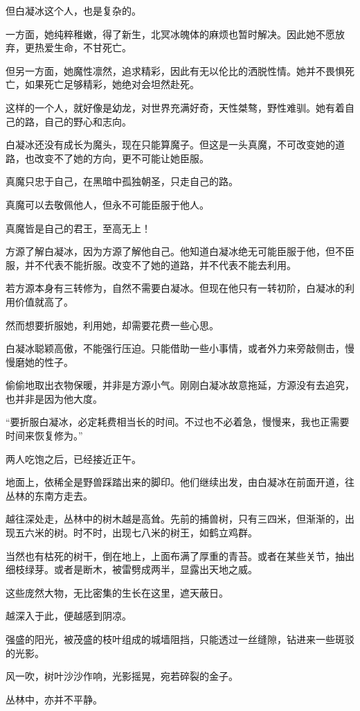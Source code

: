 \begin{this_body}
但白凝冰这个人，也是复杂的。

一方面，她纯粹稚嫩，得了新生，北冥冰魄体的麻烦也暂时解决。因此她不愿放弃，更热爱生命，不甘死亡。

但另一方面，她魔性凛然，追求精彩，因此有无以伦比的洒脱性情。她并不畏惧死亡，如果死亡足够精彩，她绝对会坦然赴死。

这样的一个人，就好像是幼龙，对世界充满好奇，天性桀骜，野性难驯。她有着自己的路，自己的野心和志向。

白凝冰还没有成长为魔头，现在只能算魔子。但这是一头真魔，不可改变她的道路，也改变不了她的方向，更不可能让她臣服。

真魔只忠于自己，在黑暗中孤独朝圣，只走自己的路。

真魔可以去敬佩他人，但永不可能臣服于他人。

真魔皆是自己的君王，至高无上！

方源了解白凝冰，因为方源了解他自己。他知道白凝冰绝无可能臣服于他，但不臣服，并不代表不能折服。改变不了她的道路，并不代表不能去利用。

若方源本身有三转修为，自然不需要白凝冰。但现在他只有一转初阶，白凝冰的利用价值就高了。

然而想要折服她，利用她，却需要花费一些心思。

白凝冰聪颖高傲，不能强行压迫。只能借助一些小事情，或者外力来旁敲侧击，慢慢磨她的性子。

偷偷地取出衣物保暖，并非是方源小气。刚刚白凝冰故意拖延，方源没有去追究，也并非是因为他大度。

“要折服白凝冰，必定耗费相当长的时间。不过也不必着急，慢慢来，我也正需要时间来恢复修为。”

两人吃饱之后，已经接近正午。

地面上，依稀全是野兽踩踏出来的脚印。他们继续出发，由白凝冰在前面开道，往丛林的东南方走去。

越往深处走，丛林中的树木越是高耸。先前的捕兽树，只有三四米，但渐渐的，出现五六米的树。时不时，出现七八米的树王，如鹤立鸡群。

当然也有枯死的树干，倒在地上，上面布满了厚重的青苔。或者在某些关节，抽出细枝绿芽。或者是断木，被雷劈成两半，显露出天地之威。

这些庞然大物，无比密集的生长在这里，遮天蔽日。

越深入于此，便越感到阴凉。

强盛的阳光，被茂盛的枝叶组成的城墙阻挡，只能透过一丝缝隙，钻进来一些斑驳的光影。

风一吹，树叶沙沙作响，光影摇晃，宛若碎裂的金子。

丛林中，亦并不平静。


\end{this_body}
